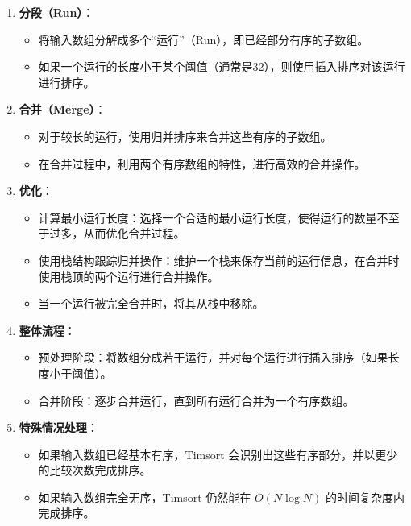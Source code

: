 \documentclass{report}
\begin{document}
\begin{enumerate}
    \item \textbf{分段（Run）}：
    \begin{itemize}
        \item 将输入数组分解成多个“运行”（Run），即已经部分有序的子数组。
        \item 如果一个运行的长度小于某个阈值（通常是32），则使用插入排序对该运行进行排序。
    \end{itemize}
    
    \item \textbf{合并（Merge）}：
    \begin{itemize}
        \item 对于较长的运行，使用归并排序来合并这些有序的子数组。
        \item 在合并过程中，利用两个有序数组的特性，进行高效的合并操作。
    \end{itemize}
    
    \item \textbf{优化}：
    \begin{itemize}
        \item 计算最小运行长度：选择一个合适的最小运行长度，使得运行的数量不至于过多，从而优化合并过程。
        \item 使用栈结构跟踪归并操作：维护一个栈来保存当前的运行信息，在合并时使用栈顶的两个运行进行合并操作。
        \item 当一个运行被完全合并时，将其从栈中移除。
    \end{itemize}
    
    \item \textbf{整体流程}：
    \begin{itemize}
        \item 预处理阶段：将数组分成若干运行，并对每个运行进行插入排序（如果长度小于阈值）。
        \item 合并阶段：逐步合并运行，直到所有运行合并为一个有序数组。
    \end{itemize}
    
    \item \textbf{特殊情况处理}：
    \begin{itemize}
        \item 如果输入数组已经基本有序，Timsort 会识别出这些有序部分，并以更少的比较次数完成排序。
        \item 如果输入数组完全无序，Timsort 仍然能在 $O(N \log N)$ 的时间复杂度内完成排序。
    \end{itemize}
\end{enumerate}
\end{document}
